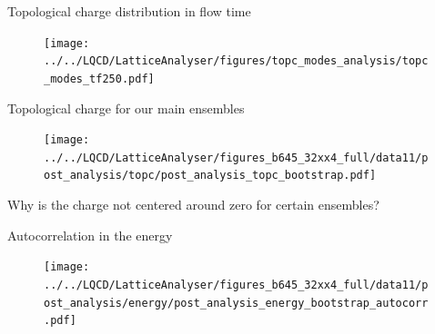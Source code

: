 \documentclass[10pt,show notes on second screen]{beamer}
\begin{document}
\begin{frame}{Topological charge distribution in flow time}
\vspace{-5.0pt}
\begin{figure}
    \centering
    \texttt{[image: ../../LQCD/LatticeAnalyser/figures/topc\_modes\_analysis/topc\_modes\_tf250.pdf]}
\end{figure}
\end{frame}


\begin{frame}{Topological charge for our main ensembles}
\vspace{-5.0pt} 
\begin{figure}
    \centering
    \texttt{[image: ../../LQCD/LatticeAnalyser/figures\_b645\_32xx4\_full/data11/post\_analysis/topc/post\_analysis\_topc\_bootstrap.pdf]}
\end{figure}
\end{frame}

\begin{frame}
\vspace{5.0pt}
\begin{center}
Why is the charge not centered around zero for certain ensembles?
\end{center}
\end{frame}

\begin{frame}{Autocorrelation in the energy}
\begin{figure}
    \centering
    \texttt{[image: ../../LQCD/LatticeAnalyser/figures\_b645\_32xx4\_full/data11/post\_analysis/energy/post\_analysis\_energy\_bootstrap\_autocorr.pdf]}
\end{figure}
\end{frame}
\end{document}
